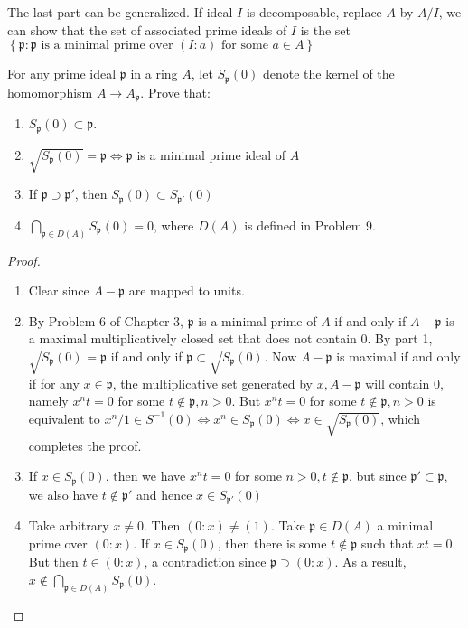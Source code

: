 \documentclass{solution}
\begin{document}
{\color{red} The last part can be generalized. If ideal $I$ is decomposable, replace $A$ by $A / I$, we can show that the set of associated prime ideals of $I$ is the set $\left\lbrace \mathfrak{p}: \mathfrak{p} \text{ is a minimal prime over } (I : a) \text{ for some } a \in A \right\rbrace$}

\begin{problem}
    For any prime ideal $\mathfrak{p}$ in a ring $A$, let $S_{\mathfrak{p}}(0)$ denote the kernel of the homomorphism $A \rightarrow A_{\mathfrak{p}}$. Prove that:
    \begin{enumerate}
        \item $S_{\mathfrak{p}}(0) \subset \mathfrak{p}$.
        \item $\sqrt{S_{\mathfrak{p}}(0)} = \mathfrak{p} \Leftrightarrow \mathfrak{p}$ is a minimal prime ideal of $A$
        \item If $\mathfrak{p} \supset \mathfrak{p}'$, then $S_{\mathfrak{p}}(0) \subset S_{\mathfrak{p}'} (0)$
        \item $\bigcap_{\mathfrak{p} \in D(A)} S_{\mathfrak{p}}(0) = 0$, where $D(A)$ is defined in Problem 9.
    \end{enumerate}
\end{problem}

\begin{proof}
    \begin{enumerate}
        \item Clear since $A - \mathfrak{p}$ are mapped to units.
        \item By Problem 6 of Chapter 3, $\mathfrak{p}$ is a minimal prime of $A$ if and only if $A - \mathfrak{p}$ is a maximal multiplicatively closed set that does not contain $0$. By part 1, $\sqrt{S_{\mathfrak{p}}(0)} = \mathfrak{p}$ if and only if $\mathfrak{p} \subset \sqrt{S_{\mathfrak{p}}(0)}$. Now $A - \mathfrak{p}$ is maximal if and only if for any $x \in \mathfrak{p}$, the multiplicative set generated by $x, A - \mathfrak{p}$ will contain $0$, namely $x^n t = 0$ for some $t \notin \mathfrak{p}, n \gt 0$. But $x^n t = 0$ for some $t \notin \mathfrak{p}, n \gt 0$ is equivalent to $x^n / 1 \in S ^{-1}(0) \Leftrightarrow x^n \in S_{\mathfrak{p}}(0) \Leftrightarrow x \in \sqrt{S_{\mathfrak{p}}(0)}$, which completes the proof.
        \item If $x \in S_{\mathfrak{p}}(0)$, then we have $x^n t = 0$ for some $n \gt 0, t \notin \mathfrak{p}$, but since $\mathfrak{p}' \subset \mathfrak{p}$, we also have $t \notin \mathfrak{p}'$ and hence $x \in S_{\mathfrak{p}'}(0)$
        \item Take arbitrary $x \ne 0$. Then $(0 : x) \ne (1)$. Take $\mathfrak{p} \in D(A)$ a minimal prime over $(0 : x)$. If $x \in S_{\mathfrak{p}}(0)$, then there is some $t \notin \mathfrak{p}$ such that $xt = 0$. But then $t \in (0 : x)$, a contradiction since $\mathfrak{p} \supset (0 : x)$. As a result, $x \notin \bigcap_{\mathfrak{p} \in D(A)} S_{\mathfrak{p}}(0)$.
    \end{enumerate}
\end{proof}
\end{document}
